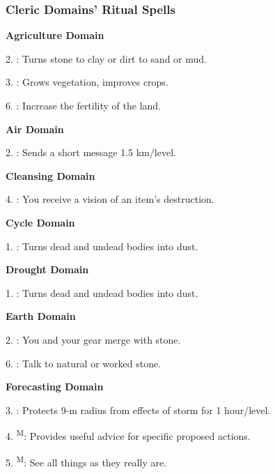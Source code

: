 \subsubsection{Cleric Domains' Ritual Spells}
\noindent\textbf{Agriculture Domain}
\begin{itemize*}
	\item[2.] : Turns stone to clay or dirt to sand or mud.
	\item[3.] : Grows vegetation, improves crops.
	\item[6.] : Increase the fertility of the land.
\end{itemize*}

\noindent\textbf{Air Domain}
\begin{itemize*}
	\item[2.] : Sends a short message 1.5 km/level.
\end{itemize*}

\noindent\textbf{Cleansing Domain}
\begin{itemize*}
	\item[4.] : You receive a vision of an item's destruction.
\end{itemize*}

\noindent\textbf{Cycle Domain}
\begin{itemize*}
	\item[1.] : Turns dead and undead bodies into dust.
\end{itemize*}

\noindent\textbf{Drought Domain}
\begin{itemize*}
	\item[1.] : Turns dead and undead bodies into dust.
\end{itemize*}

\noindent\textbf{Earth Domain}
\begin{itemize*}
	\item[2.] : You and your gear merge with stone.
	\item[6.] : Talk to natural or worked stone.
\end{itemize*}

\noindent\textbf{Forecasting Domain}
\begin{itemize*}
	\item[3.] : Protects 9-m radius from effects of storm for 1 hour/level.
	\item[4.] \textsuperscript{M}: Provides useful advice for specific proposed actions.
	\item[5.] \textsuperscript{M}: See all things as they really are.
\end{itemize*}

